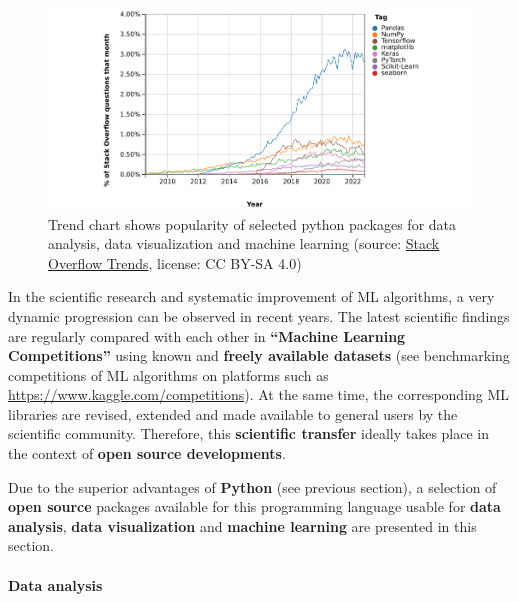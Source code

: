 \documentclass [oneside,10pt,a4paper,ngerman,BCOR10mm,headsepline,parindent,final]{scrartcl}
\begin{document}
\begin{figure}
\centering
\includegraphics{images/2022-11-11_StackOverflowTrends_MLPythonPackages_wide.png}
\caption{Trend chart shows popularity of selected python packages for
data analysis, data visualization and machine learning (source:
\href{https://insights.stackoverflow.com/trends?tags=pandas\%2Cnumpy\%2Cmatplotlib\%2Cseaborn\%2Cscikit-learn\%2Ctensorflow\%2Ckeras\%2Cpytorch}{Stack
Overflow Trends}, license: CC BY-SA 4.0)}
\end{figure}

In the scientific research and systematic improvement of ML algorithms,
a very dynamic progression can be observed in recent years. The latest
scientific findings are regularly compared with each other in
\textbf{``Machine Learning Competitions''} using known and
\textbf{freely available datasets} (see benchmarking competitions of ML
algorithms on platforms such as
\url{https://www.kaggle.com/competitions}). At the same time, the
corresponding ML libraries are revised, extended and made available to
general users by the scientific community. Therefore, this
\textbf{scientific transfer} ideally takes place in the context of
\textbf{open source developments}.

Due to the superior advantages of \textbf{Python} (see previous
section), a selection of \textbf{open source} packages available for
this programming language usable for \textbf{data analysis},
\textbf{data visualization} and \textbf{machine learning} are presented
in this section.

    \hypertarget{data-analysis}{%
\paragraph{Data analysis}\label{data-analysis}}
\end{document}
